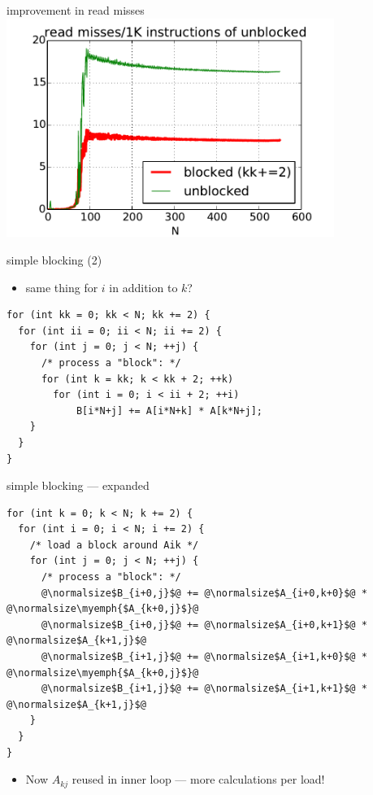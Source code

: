 \begin{frame}{improvement in read misses}
\includegraphics[width=0.8\textwidth]{../caching/k-kk-novec-block-read_miss_rate}
\end{frame}


\begin{frame}[fragile,label=cacheBlockExamplePartial]{simple blocking (2)}
\begin{itemize}
\item same thing for $i$ in addition to $k$?
\end{itemize}
\begin{lstlisting}
for (int kk = 0; kk < N; kk += 2) {
  for (int ii = 0; ii < N; ii += 2) {
    for (int j = 0; j < N; ++j) {
      /* process a "block": */
      for (int k = kk; k < kk + 2; ++k)
        for (int i = 0; i < ii + 2; ++i)
            B[i*N+j] += A[i*N+k] * A[k*N+j];
    }
  }
}
\end{lstlisting}
\end{frame}

\begin{frame}[fragile,label=cacheBlockExamplePartialExpand]{simple blocking --- expanded}
\lstset{style=small,language=C,escapechar=@}
\begin{lstlisting}
for (int k = 0; k < N; k += 2) {
  for (int i = 0; i < N; i += 2) {
    /* load a block around Aik */
    for (int j = 0; j < N; ++j) {
      /* process a "block": */
      @\normalsize$B_{i+0,j}$@ += @\normalsize$A_{i+0,k+0}$@ * @\normalsize\myemph{$A_{k+0,j}$}@
      @\normalsize$B_{i+0,j}$@ += @\normalsize$A_{i+0,k+1}$@ * @\normalsize$A_{k+1,j}$@
      @\normalsize$B_{i+1,j}$@ += @\normalsize$A_{i+1,k+0}$@ * @\normalsize\myemph{$A_{k+0,j}$}@
      @\normalsize$B_{i+1,j}$@ += @\normalsize$A_{i+1,k+1}$@ * @\normalsize$A_{k+1,j}$@
    }
  }
}
\end{lstlisting}
\begin{itemize}
\item<2-> Now $A_{kj}$ reused in inner loop --- more calculations per load!
\end{itemize}
\end{frame}

